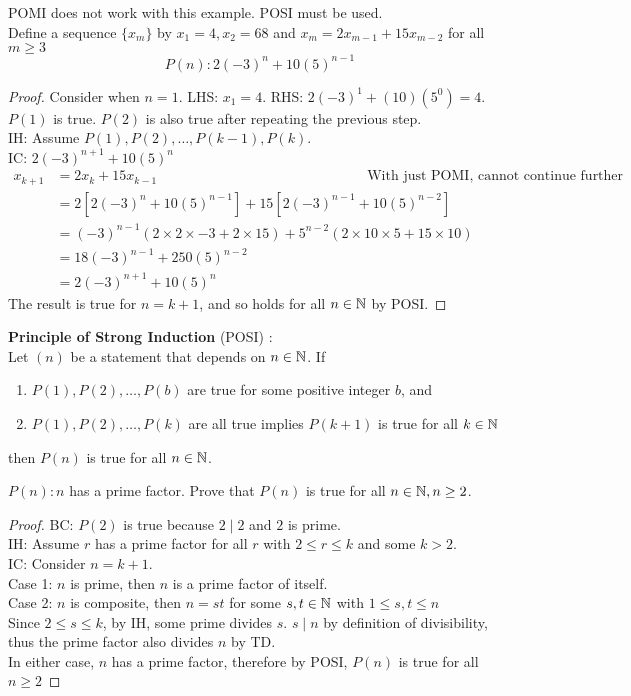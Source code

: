 \documentclass[english, 12pt]{article}
\begin{document}
\begin{exmp}
POMI does not work with this example. POSI must be used.\\
 Define a sequence $\{ x_{m}\}$ by $x_{1} = 4, x_{2} = 68$ and $x_{m} = 2x_{m-1} + 15x _{m-2} $ for all $m \geq 3$
\[ P(n): 2(-3)^n + 10(5)^{n-1} \]
\begin{proof}
Consider when $n=1$. LHS: $x_{1} = 4$. RHS: $ 2(-3)^1 + (10)(5^0) = 4$. $P(1)$ is true. $P(2)$ is also true after repeating the previous step.\\
IH: Assume $P(1), P(2), \dots, P(k-1), P(k)$. \\
IC: $ 2(-3)^{n+1} + 10(5)^n$
\begin{align*}
x_{k+1} & = 2x_{k} + 15x_{k-1}\hspace{180pt} \text{With just POMI, cannot continue further}\\
& = 2[2(-3)^n + 10 (5)^{n-1}] + 15 [2(-3)^{n-1} + 10(5)^{n-2}]\\
& = (-3)^{n-1} (2\times 2\times -3 + 2 \times 15) + 5^{n-2}(2 \times 10 \times 5 + 15 \times 10)\\
& = 18(-3)^{n-1} + 250(5)^{n-2}\\
& = 2(-3)^{n+1} + 10(5)^{n}
\end{align*}
The result is true for $n = k+1$, and so holds for all $n \in {\mathbb{N}}$ by POSI.
\end{proof}
\end{exmp}
\begin{mthd}
\textbf{Principle of Strong Induction} (POSI) :\\
Let $(n)$ be a statement that depends on $n \in {\mathbb{N}}$. If 
\begin{enumerate}
\item $P(1),P(2), \dots, P(b)$ are true for some positive integer $b$, and
\item $P(1),P(2), \dots,P(k)$ are all true implies $P(k+1)$ is true for all $ k \in {\mathbb{N}}$
\end{enumerate}
then $P(n)$ is true for all $n \in {\mathbb{N}}$.
\end{mthd}
\begin{exmp}
$P(n): n$ has a prime factor. Prove that $P(n)$ is true for all $n \in {\mathbb{N}}, n \geq 2$.
\begin{proof}
BC: $P(2)$ is true because $2 \mid 2$ and $2$ is prime.\\
IH: Assume $r$ has a prime factor for all $r$ with $2 \leq r \leq k$ and some $k > 2$. \\
IC: Consider $n=k+1$.\\
Case 1: $n$ is prime, then $n$ is a prime factor of itself.\\
Case 2: $n$ is composite, then $n=st$ for some $s,t \in {\mathbb{N}}$ with $1 \leq s,t \leq n$\\
Since $2 \leq s \leq k$, by IH, some prime divides $s$. $s \mid n$ by definition of divisibility, thus the prime factor also divides $n$ by TD. \\
In either case, $n$ has a prime factor, therefore by POSI, $P(n)$ is true for all $ n \geq 2$
\end{proof}
\end{exmp}
\end{document}
